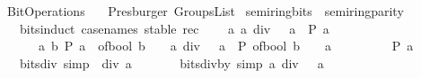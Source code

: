 %
\begin{isabellebody}%
%
%
\isadelimdocument
%
\endisadelimdocument
%
\isatagdocument
%
\isamarkuptrue%
%
\endisatagdocument
{\isafolddocument}%
%
\isadelimdocument
%
\endisadelimdocument
%
\isadelimtheory
%
\endisadelimtheory
%
\isatagtheory
{}\isamarkupfalse%
\ Bit{\isacharunderscore}{\kern0pt}Operations\isanewline
\ \ \ Presburger\ Groups{\isacharunderscore}{\kern0pt}List\isanewline
{}%
\endisatagtheory
{\isafoldtheory}%
%
\isadelimtheory
%
\endisadelimtheory
%
\isadelimdocument
%
\endisadelimdocument
%
\isatagdocument
%
\isamarkuptrue%
%
\endisatagdocument
{\isafolddocument}%
%
\isadelimdocument
%
\endisadelimdocument
{}\isamarkupfalse%
\ semiring{\isacharunderscore}{\kern0pt}bits\ {\isacharequal}{\kern0pt}\ semiring{\isacharunderscore}{\kern0pt}parity\ {\isacharplus}{\kern0pt}\isanewline
\ \ \ bits{\isacharunderscore}{\kern0pt}induct\ {\isacharbrackleft}{\kern0pt}case{\isacharunderscore}{\kern0pt}names\ stable\ rec{\isacharbrackright}{\kern0pt}{\isacharcolon}{\kern0pt}\isanewline
\ \ \ \ {\isacartoucheopen}{\isacharparenleft}{\kern0pt}{\isasymAnd}a{\isachardot}{\kern0pt}\ a\ div\ {}\ {\isacharequal}{\kern0pt}\ a\ {\isasymLongrightarrow}\ P\ a{\isacharparenright}{\kern0pt}\isanewline
\ \ \ \ \ {\isasymLongrightarrow}\ {\isacharparenleft}{\kern0pt}{\isasymAnd}a\ b{\isachardot}{\kern0pt}\ P\ a\ {\isasymLongrightarrow}\ {\isacharparenleft}{\kern0pt}of{\isacharunderscore}{\kern0pt}bool\ b\ {\isacharplus}{\kern0pt}\ {}\ {\isacharasterisk}{\kern0pt}\ a{\isacharparenright}{\kern0pt}\ div\ {}\ {\isacharequal}{\kern0pt}\ a\ {\isasymLongrightarrow}\ P\ {\isacharparenleft}{\kern0pt}of{\isacharunderscore}{\kern0pt}bool\ b\ {\isacharplus}{\kern0pt}\ {}\ {\isacharasterisk}{\kern0pt}\ a{\isacharparenright}{\kern0pt}{\isacharparenright}{\kern0pt}\isanewline
\ \ \ \ \ \ \ \ {\isasymLongrightarrow}\ P\ a{\isacartoucheclose}\isanewline
\ \ \ bits{\isacharunderscore}{\kern0pt}div{\isacharunderscore}{\kern0pt}{}\ {\isacharbrackleft}{\kern0pt}simp{\isacharbrackright}{\kern0pt}{\isacharcolon}{\kern0pt}\ {\isacartoucheopen}{}\ div\ a\ {\isacharequal}{\kern0pt}\ {}{\isacartoucheclose}\isanewline
\ \ \ \ \ bits{\isacharunderscore}{\kern0pt}div{\isacharunderscore}{\kern0pt}by{\isacharunderscore}{\kern0pt}{}\ {\isacharbrackleft}{\kern0pt}simp{\isacharbrackright}{\kern0pt}{\isacharcolon}{\kern0pt}\ {\isacartoucheopen}a\ div\ {}\ {\isacharequal}{\kern0pt}\ a{\isacartoucheclose}\isanewline

\end{isabellebody}
